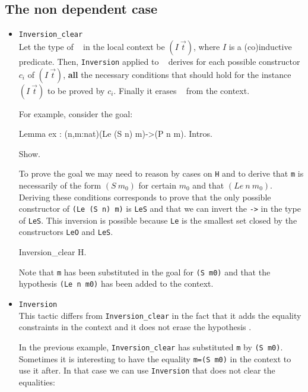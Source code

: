 \subsection{The non dependent case}
\begin{itemize}

\item \texttt{Inversion\_clear} \ident~\\
  Let the type of \ident~ in the local context be $(I~\vec{t})$,
  where $I$ is a (co)inductive predicate. Then,
  \texttt{Inversion} applied to \ident~ derives for each possible
  constructor $c_i$ of $(I~\vec{t})$, {\bf all} the necessary
  conditions that should hold for the instance $(I~\vec{t})$ to be
  proved by $c_i$. Finally it erases \ident~ from the context.



For example, consider the goal:
\begin{coq_eval}
Lemma ex : (n,m:nat)(Le (S n) m)->(P n m).
Intros.
\end{coq_eval}

\begin{coq_example}
Show.
\end{coq_example}

To prove the goal we may need to reason by cases on \texttt{H} and to 
 derive that \texttt{m}  is necessarily of
the form $(S~m_0)$ for certain $m_0$ and that $(Le~n~m_0)$.  
Deriving these conditions corresponds to prove that the
only possible constructor of \texttt{(Le (S n) m)}  is
\texttt{LeS} and that we can invert the 
\texttt{->} in the type  of \texttt{LeS}.  
This inversion is possible because \texttt{Le} is the smallest set closed by
the constructors \texttt{LeO} and \texttt{LeS}.


\begin{coq_example}
Inversion_clear  H.
\end{coq_example}

Note that \texttt{m} has been substituted in the goal for \texttt{(S m0)}
and that the hypothesis \texttt{(Le n m0)} has been added to the
context.

\item \texttt{Inversion} \ident~\\
  This tactic differs from   {\tt Inversion\_clear} in the fact that
  it adds the equality constraints in the context and
  it does not erase  the hypothesis \ident.


In the previous example, {\tt Inversion\_clear} 
has substituted \texttt{m} by \texttt{(S m0)}. Sometimes it is
interesting to have the equality \texttt{m=(S m0)} in the
context to use it after. In that case we can use  \texttt{Inversion} that
does not clear the equalities:


\end{itemize}
